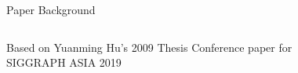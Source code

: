 \begin{frame}{Paper Background}
\begin{columns}
\centering
\begin{outline}
    \1 Based on Yuanming Hu's 2009 Thesis
    \2 Conference paper for \\ SIGGRAPH ASIA 2019
\end{outline}
\centering
{}


\end{columns}

\end{frame}
